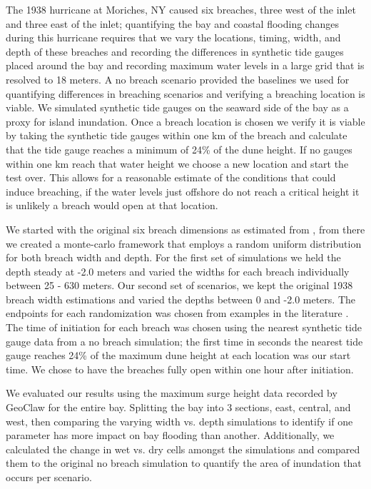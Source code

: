 \documentclass{coastal_paper}
\begin{document}
The 1938 hurricane at Moriches, NY caused six breaches, three west of the inlet and three east of the inlet; quantifying the bay and coastal flooding changes during this hurricane requires that we vary the locations, timing, width, and depth of these breaches and recording the differences in synthetic tide gauges placed around the bay and recording maximum water levels in a large grid that is resolved to 18 meters. A no breach scenario provided the baselines we used for quantifying differences in breaching scenarios and verifying a breaching location is viable. We simulated synthetic tide gauges on the seaward side of the bay as a proxy for island inundation. Once a breach location is chosen we verify it is viable by taking the synthetic tide gauges within one km of the breach and calculate that the tide gauge reaches a minimum of 24\% of the dune height. If no gauges within one km reach that water height we choose a new location and start the test over. This allows for a reasonable estimate of the conditions that could induce breaching, if the water levels just offshore do not reach a critical height it is unlikely a breach would open at that location.

We started with the original six breach dimensions as estimated from \citet{Canizares2008}, from there we created a monte-carlo framework that employs a random uniform distribution for both breach width and depth. For the first set of simulations we held the depth steady at -2.0 meters and varied the widths for each breach individually between 25 - 630 meters. Our second set of scenarios, we kept the original 1938 breach width estimations and varied the depths between 0 and -2.0 meters. The endpoints for each randomization was chosen from examples in the literature \citep{Schmeltz1983Breach/InletInlet., Kraus2003a,Visser1999, Canizares2008}. The time of initiation for each breach was chosen using the nearest synthetic tide gauge data from a no breach simulation; the first time in seconds the nearest tide gauge reaches 24\% of the maximum dune height at each location was our start time. We chose to have the breaches fully open within one hour after initiation.

We evaluated our results using the maximum surge height data recorded by GeoClaw for the entire bay. Splitting the bay into 3 sections, east, central, and west, then comparing the varying width vs. depth simulations to identify if one parameter has more impact on bay flooding than another. Additionally, we calculated the change in wet vs. dry cells amongst the simulations and compared them to the original no breach simulation to quantify the area of inundation that occurs per scenario.
\end{document}
